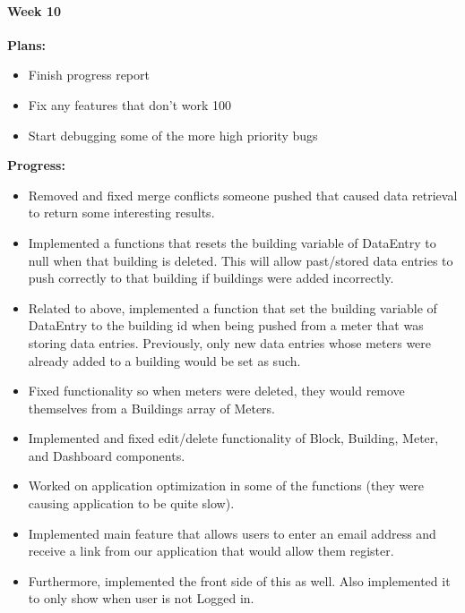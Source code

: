 \paragraph{Week 10}
\begin{adjustwidth}{2.5em}{0pt} 
    \vspace{-0.5cm}\textbf{Plans:}
    \vspace{-0.5cm}
    \begin{itemize}
        \item Finish progress report 
        \item Fix any features that don't work 100%
        \item Start debugging some of the more high priority bugs
    \end{itemize} 
    \vspace{-0.3cm}\textbf{Progress:}
    \vspace{-0.5cm}
    \begin{itemize}
        \item Removed and fixed merge conflicts someone pushed that caused data retrieval to return some interesting results. 
        \item Implemented a functions that resets the building variable of DataEntry to null when that building is deleted. This will allow past/stored data entries to push correctly to that building if buildings were added incorrectly. 
        \item Related to above, implemented a function that set the building variable of DataEntry to the building id  when being pushed from a meter that was storing data entries. Previously, only new data entries whose meters were already added to a building would be set as such. 
        \item Fixed functionality so when meters were deleted, they would remove themselves from a Buildings array of Meters. 
        \item Implemented and fixed edit/delete functionality of Block, Building, Meter, and Dashboard components. 
        \item Worked on application optimization in some of the functions (they were causing application to be quite slow). 
        \item Implemented main feature that allows users to enter an email address and receive a link from our application that would allow them register. 
        \item Furthermore, implemented the front side of this as well. Also implemented it to only show when user is not Logged in. 

\end{itemize}
\end{adjustwidth}
